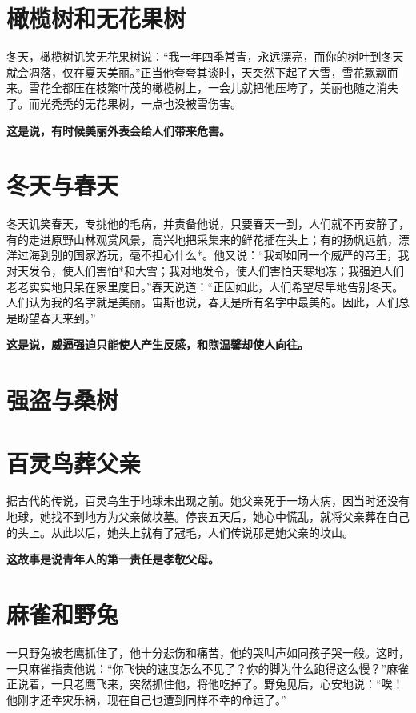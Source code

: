 \section{橄榄树和无花果树}

冬天，橄榄树讥笑无花果树说：“我一年四季常青，永远漂亮，而你的树叶到冬天就会凋落，仅在夏天美丽。”正当他夸夸其谈时，天突然下起了大雪，雪花飘飘而来。雪花全都压在枝繁叶茂的橄榄树上，一会儿就把他压垮了，美丽也随之消失了。而光秃秃的无花果树，一点也没被雪伤害。

{\bfseries \color{red}这是说，有时候美丽外表会给人们带来危害。}

\section{冬天与春天}

冬天讥笑春天，专挑他的毛病，并责备他说，只要春天一到，人们就不再安静了，有的走进原野山林观赏风景，高兴地把采集来的鲜花插在头上；有的扬帆远航，漂洋过海到别的国家游玩，毫不担心什么*。他又说：“我却如同一个威严的帝王，我对天发令，使人们害怕*和大雪；我对地发令，使人们害怕天寒地冻；我强迫人们老老实实地只呆在家里度日。”春天说道：“正因如此，人们希望尽早地告别冬天。人们认为我的名字就是美丽。宙斯也说，春天是所有名字中最美的。因此，人们总是盼望春天来到。”

{\bfseries \color{red}这是说，威逼强迫只能使人产生反感，和煦温馨却使人向往。}

\section{强盗与桑树}



{\bfseries \color{red}}

\section{百灵鸟葬父亲}

据古代的传说，百灵鸟生于地球未出现之前。她父亲死于一场大病，因当时还没有地球，她找不到地方为父亲做坟墓。停丧五天后，她心中慌乱，就将父亲葬在自己的头上。从此以后，她头上就有了冠毛，人们传说那是她父亲的坟山。

{\bfseries \color{red}这故事是说青年人的第一责任是孝敬父母。}

\section{麻雀和野兔}

一只野兔被老鹰抓住了，他十分悲伤和痛苦，他的哭叫声如同孩子哭一般。这时，一只麻雀指责他说：“你飞快的速度怎么不见了？你的脚为什么跑得这么慢？”麻雀正说着，一只老鹰飞来，突然抓住他，将他吃掉了。野兔见后，心安地说：“唉！他刚才还幸灾乐祸，现在自己也遭到同样不幸的命运了。”

